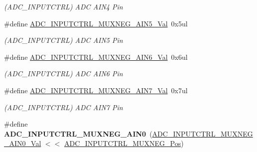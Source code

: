 \begin{DoxyCompactItemize}
\begin{DoxyCompactList}\small\item\em (A\+D\+C\+\_\+\+I\+N\+P\+U\+T\+C\+T\+R\+L) A\+D\+C A\+I\+N4 Pin \end{DoxyCompactList}\item 
\hypertarget{group___s_a_m_l21___a_d_c_ga69a5997a4dfb766d498952d9d402d288}{}\#define \hyperlink{group___s_a_m_l21___a_d_c_ga69a5997a4dfb766d498952d9d402d288}{A\+D\+C\+\_\+\+I\+N\+P\+U\+T\+C\+T\+R\+L\+\_\+\+M\+U\+X\+N\+E\+G\+\_\+\+A\+I\+N5\+\_\+\+Val}~0x5ul\label{group___s_a_m_l21___a_d_c_ga69a5997a4dfb766d498952d9d402d288}

\begin{DoxyCompactList}\small\item\em (A\+D\+C\+\_\+\+I\+N\+P\+U\+T\+C\+T\+R\+L) A\+D\+C A\+I\+N5 Pin \end{DoxyCompactList}\item 
\hypertarget{group___s_a_m_l21___a_d_c_ga879062c4bac98ffbe47d11665f9e978a}{}\#define \hyperlink{group___s_a_m_l21___a_d_c_ga879062c4bac98ffbe47d11665f9e978a}{A\+D\+C\+\_\+\+I\+N\+P\+U\+T\+C\+T\+R\+L\+\_\+\+M\+U\+X\+N\+E\+G\+\_\+\+A\+I\+N6\+\_\+\+Val}~0x6ul\label{group___s_a_m_l21___a_d_c_ga879062c4bac98ffbe47d11665f9e978a}

\begin{DoxyCompactList}\small\item\em (A\+D\+C\+\_\+\+I\+N\+P\+U\+T\+C\+T\+R\+L) A\+D\+C A\+I\+N6 Pin \end{DoxyCompactList}\item 
\hypertarget{group___s_a_m_l21___a_d_c_ga95bc808b5e5ac3789c0fdf6c9b9e01b0}{}\#define \hyperlink{group___s_a_m_l21___a_d_c_ga95bc808b5e5ac3789c0fdf6c9b9e01b0}{A\+D\+C\+\_\+\+I\+N\+P\+U\+T\+C\+T\+R\+L\+\_\+\+M\+U\+X\+N\+E\+G\+\_\+\+A\+I\+N7\+\_\+\+Val}~0x7ul\label{group___s_a_m_l21___a_d_c_ga95bc808b5e5ac3789c0fdf6c9b9e01b0}

\begin{DoxyCompactList}\small\item\em (A\+D\+C\+\_\+\+I\+N\+P\+U\+T\+C\+T\+R\+L) A\+D\+C A\+I\+N7 Pin \end{DoxyCompactList}\item 
\hypertarget{group___s_a_m_l21___a_d_c_gac218f04e717d3f54bd05c63a34d003cc}{}\#define {\bfseries A\+D\+C\+\_\+\+I\+N\+P\+U\+T\+C\+T\+R\+L\+\_\+\+M\+U\+X\+N\+E\+G\+\_\+\+A\+I\+N0}~(\hyperlink{group___s_a_m_l21___a_d_c_ga867dfa8f9e6a66a7a2ea43d6dbd13764}{A\+D\+C\+\_\+\+I\+N\+P\+U\+T\+C\+T\+R\+L\+\_\+\+M\+U\+X\+N\+E\+G\+\_\+\+A\+I\+N0\+\_\+\+Val} $<$$<$ \hyperlink{group___s_a_m_l21___a_d_c_ga47f933ef105812dd56ccffab8f7a0877}{A\+D\+C\+\_\+\+I\+N\+P\+U\+T\+C\+T\+R\+L\+\_\+\+M\+U\+X\+N\+E\+G\+\_\+\+Pos})\label{group___s_a_m_l21___a_d_c_gac218f04e717d3f54bd05c63a34d003cc}


\end{DoxyCompactItemize}

